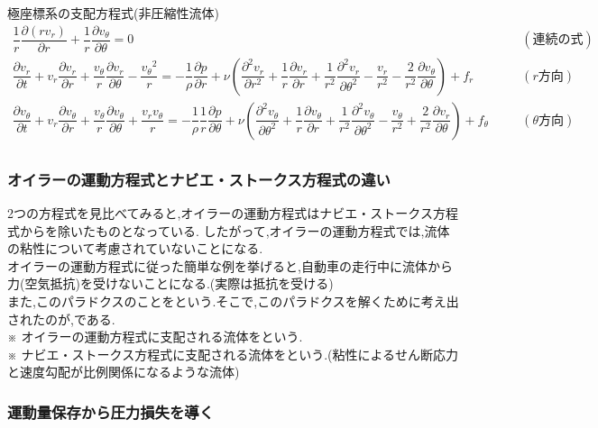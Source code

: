 \documentclass[a4paper]{jsarticle}
\begin{document}
\begin{itembox}[l]{極座標系の支配方程式\quad(非圧縮性流体)}
    \begin{eqnarray*}
        \dfrac{1}{r}\dfrac{\partial \left(rv_r\right)}{\partial r}+\dfrac{1}{r}\dfrac{\partial v_\theta}{\partial \theta}=0\quad&&(連続の式)\\
        \dfrac{\partial v_r}{\partial t}+v_r\dfrac{\partial v_r}{\partial r}+\dfrac{v_\theta}{r}\dfrac{\partial v_r}{\partial \theta}-\dfrac{{v_\theta}^2}{r}=-\dfrac{1}{\rho}\dfrac{\partial p}{\partial r}+\nu \left(\dfrac{\partial^2 v_r}{\partial r^2}+\dfrac{1}{r}\dfrac{\partial v_r}{\partial r}+\dfrac{1}{r^2}\dfrac{\partial^2 v_r}{\partial \theta^2}-\dfrac{v_r}{r^2}-\dfrac{2}{r^2}\dfrac{\partial v_\theta}{\partial \theta}\right)+f_r\quad&&(r方向)\\
        \dfrac{\partial v_\theta}{\partial t}+v_r\dfrac{\partial v_\theta}{\partial r}+\dfrac{v_\theta}{r}\dfrac{\partial v_\theta}{\partial \theta}+\dfrac{v_rv_\theta}{r}=-\dfrac{1}{\rho}\dfrac{1}{r}\dfrac{\partial p}{\partial \theta}+\nu\left(\dfrac{\partial^2 v_\theta}{\partial \theta^2}+\dfrac{1}{r}\dfrac{\partial v_\theta}{\partial r}+\dfrac{1}{r^2}\dfrac{\partial^2 v_\theta}{\partial \theta^2}-\dfrac{v_\theta}{r^2}+\dfrac{2}{r^2}\dfrac{\partial v_r}{\partial \theta}\right)+f_\theta\quad&&(\theta 方向)\\
    \end{eqnarray*}
\end{itembox}
\subsubsection{オイラーの運動方程式とナビエ・ストークス方程式の違い}
2つの方程式を見比べてみると,オイラーの運動方程式はナビエ・ストークス方程式からを除いたものとなっている.
したがって,オイラーの運動方程式では,流体の粘性について考慮されていないことになる.\\
オイラーの運動方程式に従った簡単な例を挙げると,自動車の走行中に流体から力(空気抵抗)を受けないことになる.(実際は抵抗を受ける)\\
また,このパラドクスのことをという.そこで,このパラドクスを解くために考え出されたのが,である.\\
※ オイラーの運動方程式に支配される流体をという.\\
※ ナビエ・ストークス方程式に支配される流体をという.(粘性によるせん断応力と速度勾配が比例関係になるような流体)
\subsubsection{運動量保存から圧力損失を導く}
\end{document}
